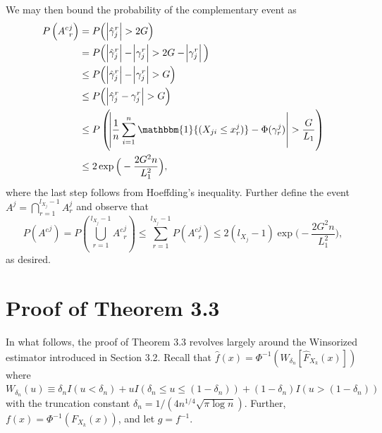 We may then bound the probability of the complementary event as
\begin{equation*}
\begin{split}
    P\left({A^c}_{r}^{j}\right) &= P\Big(\abs{\hat{\gamma}_j^r} > 2G\Big) \\
                     &= P\Big(\abs{\hat{\gamma}_j^r} - \abs{\gamma_j^r} > 2G - \abs{\gamma_j^r}\Big) \\
                     &\leq P\Big(\abs{\hat{\gamma}_j^r} - \abs{\gamma_j^r} > G\Big) \\
                     &\leq P\Big(\abs{\hat{\gamma}_j^r - \gamma_j^r} > G\Big) \\
                     &\leq P\left(\abs{\frac{1}{n} \sum_{i=1}^n \mathbbm{1}{(X_{ji} \leq x_r^j)} - \Phi(\gamma_r^j)} > \frac{G}{L_1}\right) \\ 
                     &\leq 2\exp{\Big(- \frac{2G^2n}{L_1^2}\Big)},
\end{split} 
\end{equation*}
where the last step follows from Hoeffding's inequality. Further define the event $A^j = \bigcap_{r=1}^{l_{X_j}-1} A_r^j$ and observe that
\begin{equation*}
    P\left({A^c}^j\right) = P\left(\bigcup_{r=1}^{l_{X_j}-1} {A^c}_r^j\right) \leq \sum_{r=1}^{l_{X_j}-1} P({A^c}_r^j) \leq 2(l_{X_j}-1)\exp{\Big(- \frac{2G^2n}{L_1^2}\Big)},
\end{equation*}
as desired. 


\section{Proof of Theorem 3.3
}\label{proof_concentration2}


In what follows, the proof of Theorem 3.3
revolves largely around the Winsorized estimator introduced in Section 3.2. %
Recall that $\hat{f}(x) = \Phi^{-1}(W_{\delta_n}[\hat{F}_{X_k}(x)])$ where $W_{\delta_n}(u) \equiv \delta_n I(u < \delta_n) + u I(\delta_n \leq u \leq (1-\delta_n)) + (1-\delta_n) I(u > (1-\delta_n))$ with the truncation constant $\delta_n = 1/(4n^{1/4}\sqrt{\pi\log n})$. Further, $f(x) = \Phi^{-1}(F_{X_k}(x))$, and let $g = f^{-1}$.
    

